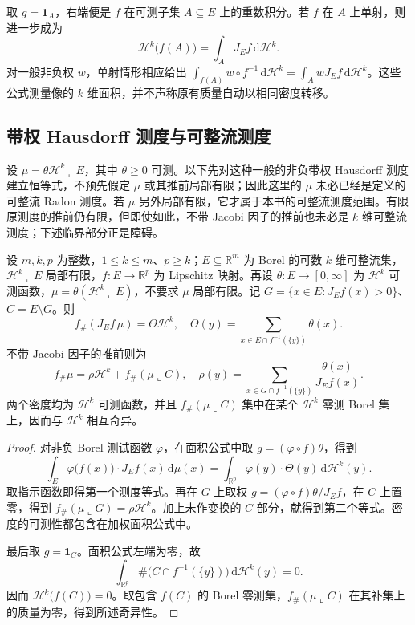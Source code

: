 取 \(g=\mathbf1_A\)，右端便是 \(f\) 在可测子集 \(A\subseteq E\) 上的重数积分。若 \(f\) 在 \(A\) 上单射，则进一步成为
\[
 \mathcal H^k\bigl(f(A)\bigr)=\int_AJ_Ef\,\mathrm{d}\mathcal H^k.
\]
对一般非负权 \(w\)，单射情形相应给出 \(\int_{f(A)}w\circ f^{-1}\,\mathrm{d}\mathcal H^k=\int_AwJ_Ef\,\mathrm{d}\mathcal H^k\)。这些公式测量像的 \(k\) 维面积，并不声称原有质量自动以相同密度转移。

\subsection{带权 Hausdorff 测度与可整流测度}
\label{b1:subsec:190304}

设 \(\mu=\theta\mathcal H^k\llcorner E\)，其中 \(\theta\geq0\) 可测。以下先对这种一般的非负带权 Hausdorff 测度建立恒等式，不预先假定 \(\mu\) 或其推前局部有限；因此这里的 \(\mu\) 未必已经是定义的可整流 Radon 测度。若 \(\mu\) 另外局部有限，它才属于本书的可整流测度范围。有限原测度的推前仍有限，但即使如此，不带 Jacobi 因子的推前也未必是 \(k\) 维可整流测度；下述临界部分正是障碍。

\begin{proposition}
\label{b1:prop:rectifiable-measure-pushforward}
设 \(m,k,p\) 为整数，\(1\leq k\leq m\)、\(p\geq k\)；\(E\subseteq\mathbb R^m\) 为 Borel 的可数 \(k\) 维可整流集，\(\mathcal H^k\llcorner E\) 局部有限，\(f:E\to\mathbb R^p\) 为 Lipschitz 映射。再设 \(\theta:E\to[0,\infty]\) 为 \(\mathcal H^k\) 可测函数，\(\mu=\theta(\mathcal H^k\llcorner E)\)，不要求 \(\mu\) 局部有限。记 \(G=\{x\in E:J_Ef(x)>0\}\)、\(C=E\setminus G\)。则
\[
 f_\#(J_Ef\,\mu)=\Theta\mathcal H^k,\quad
 \Theta(y)=\sum_{x\in E\cap f^{-1}(\{y\})}\theta(x).
\]
不带 Jacobi 因子的推前则为
\[
 f_\#\mu=\rho\mathcal H^k+f_\#(\mu\llcorner C),\quad
 \rho(y)=\sum_{x\in G\cap f^{-1}(\{y\})}
          \dfrac{\theta(x)}{J_Ef(x)}.
\]
两个密度均为 \(\mathcal H^k\) 可测函数，并且 \(f_\#(\mu\llcorner C)\) 集中在某个 \(\mathcal H^k\) 零测 Borel 集上，因而与 \(\mathcal H^k\) 相互奇异。
\end{proposition}
\begin{proof}
对非负 Borel 测试函数 \(\varphi\)，在面积公式中取 \(g=(\varphi\circ f)\theta\)，得到
\[
 \int_E\varphi\bigl(f(x)\bigr)\cdot J_Ef(x)\,\mathrm{d}\mu(x)
 =\int_{\mathbb R^p}\varphi(y)\cdot\Theta(y)\,\mathrm{d}\mathcal H^k(y).
\]
取指示函数即得第一个测度等式。再在 \(G\) 上取权 \(g=(\varphi\circ f)\theta/J_Ef\)，在 \(C\) 上置零，得到 \(f_\#(\mu\llcorner G)=\rho\mathcal H^k\)。加上未作变换的 \(C\) 部分，就得到第二个等式。密度的可测性都包含在加权面积公式中。

最后取 \(g=\mathbf1_C\)。面积公式左端为零，故
\[
 \int_{\mathbb R^p}\#\bigl(C\cap f^{-1}(\{y\})\bigr)
 \,\mathrm{d}\mathcal H^k(y)=0.
\]
因而 \(\mathcal H^k\bigl(f(C)\bigr)=0\)。取包含 \(f(C)\) 的 Borel 零测集，\(f_\#(\mu\llcorner C)\) 在其补集上的质量为零，得到所述奇异性。
\end{proof}

